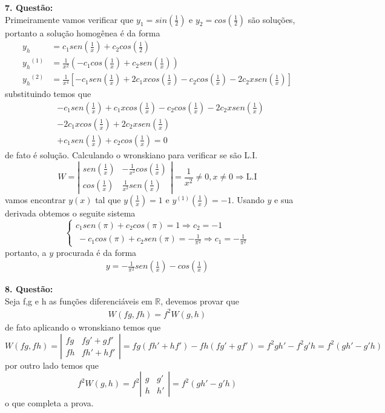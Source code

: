 \documentclass[a4paper,12pt]{article}
\begin{document}
\textbf{7. Quest\~ao:}\\
Primeiramente vamos verificar que $y_1 = sin(\frac{1}{2})$ e $y_2 = cos(\frac{1}{2})$ s\~ao solu\c c\~oes, portanto a
solu\c c\~ao homog\^enea \'e da forma 
\begin{align*}
	y_h &= c_1 sen(\frac{1}{x}) + c_2 cos(\frac{1}{2}) \\
	{y_h}^{(1)} &= \frac{1}{x^{2}} (-c_1 cos (\frac{1}{x}) + c_2 sen (\frac{1}{x})) \\
	{y_h}^{(2)} &= \frac{1}{x^{4}}[ -c_1 sen(\frac{1}{x}) + 2c_1xcos(\frac{1}{x}) -c_2 cos(\frac{1}{x}) -2c_2
	xsen(\frac{1}{x})]
\end{align*}
substituindo temos que 
\begin{align*}
	&-c_1 sen(\frac{1}{x}) + c_1 x cos(\frac{1}{x}) -c_2cos(\frac{1}{x}) -2c_2xsen(\frac{1}{x}) \\
	& -2c_1 xcos(\frac{1}{x}) +2c_2 x sen(\frac{1}{x}) \\
	& + c_1 sen(\frac{1}{x}) + c_2 cos(\frac{1}{x}) = 0
\end{align*}
de fato \'e solu\c c\~ao. Calculando o wronskiano para verificar se s\~ao L.I.
\[ W = \left |
	\begin{array}{cc}	
		sen(\frac{1}{x}) & -\frac{1}{x^{2}} cos(\frac{1}{x}) \\
		cos(\frac{1}{x}) & \frac{1}{x^{2}} sen(\frac{1}{x})
	\end{array}
	\right |  = \frac{1}{x^{2}} \neq 0, x\neq 0 \Rightarrow \mbox{L.I}
\]
vamos encontrar $y(x)$ tal que $y(\frac{1}{x}) = 1$ e $y^{(1)}(\frac{1}{x}) = -1.$ 
Usando $y$ e sua derivada obtemos o seguite sistema
\[\left \{ 
	\begin{array}{cc}	
		c_1 sen(\pi) + c_2 cos(\pi) = 1  \Rightarrow c_2 = -1 \\\
		-c_1cos(\pi) + c_2 sen(\pi) = -\frac{1}{{\pi}^{2}} \Rightarrow c_1 = -\frac{1}{{\pi}^{2}}
	\end{array}
	\right . 
\]
portanto, a  $y$ procurada \'e da forma 
\begin{align*}
	y = -\frac{1}{{\pi}^{2}} sen(\frac{1}{x}) -cos(\frac{1}{x})
\end{align*}

\textbf{8. Quest\~ao:}\\
Seja f,g e h as fun\c c\~oes diferenci\'aveis em $\mathbb{R}$, devemos provar que 
\begin{align*}
	W(fg,fh) = f^{2}W(g,h)
\end{align*}
de fato aplicando o wronskiano temos que
\[ W (fg,fh) = \left  |
	\begin{array}{cc}
		fg & fg' + gf' \\
		fh & fh' + hf'
	\end{array}
	\right  | = fg(fh' + hf')  -fh (fg' + gf') = f^{2} gh' - f^{2} g'h = f^{2}(gh' -g'h) 
\]
por outro lado temos que 
\[ f^{2} W(g,h) = f^{2}\left |
	\begin{array}{cc}
		g & g' \\
		h & h'
	\end{array}
	\right |  = f^{2} (gh' - g'h)
\]
o que completa a prova.
\end{document}
